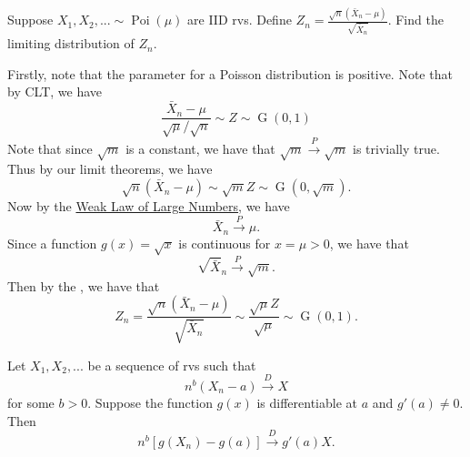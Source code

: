\documentclass[notoc,notitlepage]{tufte-book}
\DeclareMathOperator{\Poi}{Poi }
\DeclareMathOperator{\Gau}{G }
\newcommand{\convd}{\overset{D}{\to}}
\newcommand{\convp}{\overset{P}{\to}}
\begin{document}
\begin{eg}\label{eg:involved_eg_for_limit_theorems}
  Suppose $X_1, X_2, ... \sim \Poi(\mu)$ are IID rvs. Define $Z_n = \frac{\sqrt{n} ( \bar{X}_n - \mu )}{\sqrt{\bar{X}_n}}$. Find the limiting distribution of $Z_n$.
\end{eg}

\begin{solution}
  Firstly, note that the parameter for a Poisson distribution is positive. Note that by CLT, we have
  \begin{equation*}
    \frac{\bar{X}_n - \mu}{\sqrt{\mu} / \sqrt{n}} \sim Z \sim \Gau(0, 1)
  \end{equation*}
  Note that since $\sqrt{m}$ is a constant, we have that $\sqrt{m} \convp \sqrt{m}$ is trivially true. Thus by our limit theorems, we have
  \begin{equation*}
    \sqrt{n} ( \bar{X}_n - \mu ) \sim \sqrt{m} Z \sim \Gau(0, \sqrt{m}).
  \end{equation*}
  Now by the \hyperref[eg:weak_law_of_large_numbers]{Weak Law of Large Numbers}, we have
  \begin{equation*}
    \bar{X}_n \convp \mu.
  \end{equation*}
  Since a function $g(x) = \sqrt{x}$ is continuous for $x = \mu > 0$, we have that
  \begin{equation*}
    \sqrt{\bar{ X }}_n \convp \sqrt{m}.
  \end{equation*}
  Then by the , we have that
  \begin{equation*}
    Z_n = \frac{\sqrt{n} ( \bar{X}_n - \mu )}{\sqrt{\bar{X}_n}} \sim \frac{\sqrt{\mu} Z}{\sqrt{\mu}} \sim \Gau(0, 1).
  \end{equation*}
\end{solution}

\begin{thm}
\label{thm:generalized_delta_method}
  Let $X_1, X_2, ...$ be a sequence of rvs such that
  \begin{equation*}
    n^b (X_n - a) \convd X
  \end{equation*}
  for some $b > 0$. Suppose the function $g(x)$ is differentiable at $a$ and $g'(a) \neq 0$. Then
  \begin{equation*}
    n^b [ g(X_n) - g(a) ] \convd g'(a) X.
  \end{equation*}
\end{thm}
\end{document}
